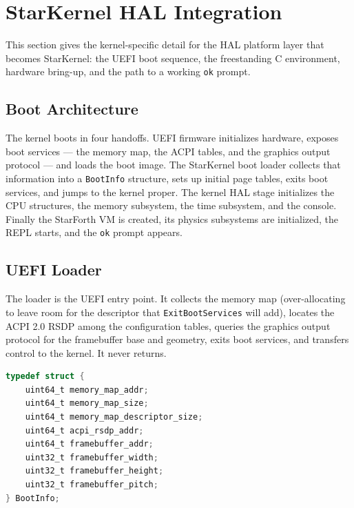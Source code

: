 
\section{StarKernel HAL Integration}

This section gives the kernel-specific detail for the HAL platform layer that
becomes StarKernel: the UEFI boot sequence, the freestanding C environment,
hardware bring-up, and the path to a working \texttt{ok} prompt.

\subsection{Boot Architecture}

The kernel boots in four handoffs. UEFI firmware initializes hardware, exposes
boot services --- the memory map, the ACPI tables, and the graphics output
protocol --- and loads the boot image. The StarKernel boot loader collects that
information into a \texttt{BootInfo} structure, sets up initial page tables,
exits boot services, and jumps to the kernel proper. The kernel HAL stage
initializes the CPU structures, the memory subsystem, the time subsystem, and the
console. Finally the StarForth VM is created, its physics subsystems are
initialized, the REPL starts, and the \texttt{ok} prompt appears.

\subsection{UEFI Loader}

The loader is the UEFI entry point. It collects the memory map (over-allocating
to leave room for the descriptor that \texttt{ExitBootServices} will add), locates
the ACPI 2.0 RSDP among the configuration tables, queries the graphics output
protocol for the framebuffer base and geometry, exits boot services, and transfers
control to the kernel. It never returns.

\begin{lstlisting}[language=C]
typedef struct {
    uint64_t memory_map_addr;
    uint64_t memory_map_size;
    uint64_t memory_map_descriptor_size;
    uint64_t acpi_rsdp_addr;
    uint64_t framebuffer_addr;
    uint32_t framebuffer_width;
    uint32_t framebuffer_height;
    uint32_t framebuffer_pitch;
} BootInfo;
\end{lstlisting}

